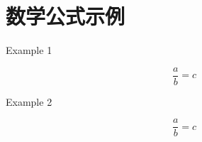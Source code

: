 \documentclass[12pt, a4paper, oneside, UTF8]{ctexbook}
\begin{document}

\else
\fi

\chapter{数学公式示例}

Example 1

\[
    \frac{a}{b} = c
\]

Example 2

\[
    \frac{a}{b} = c
\]

\ifx\allfiles\undefined
\end{document}
